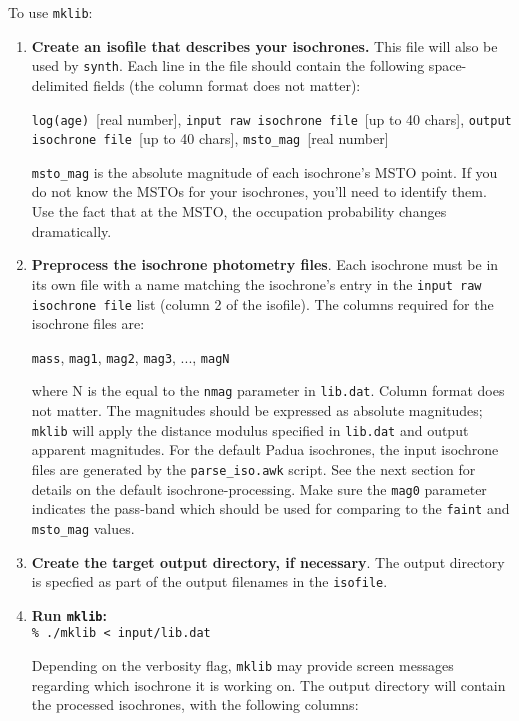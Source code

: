 \documentclass[12pt]{book}
\def\ttg{\tt\color{DarkGreen}}
\def\tto{\tt\color{myOrange}}
\begin{document}
\clearpage

\noindent
To use {\ttg mklib}:

\begin{enumerate}
\item {\bf Create an isofile that describes your isochrones.}  This 
file will also be used by {\ttg synth}.  Each line in the file should 
contain the following space-delimited fields (the column format does 
not matter):

\medskip\noindent
{\tto log(age)}~[real number], 
{\tto input raw isochrone file}~[up to 40 chars], 
{\tto output isochrone file}~[up to 40 chars], 
{\tto msto\_mag}~[real number]

\medskip
{\tto msto\_mag} is the absolute magnitude of each isochrone's MSTO point.  
If you do not know the MSTOs for your isochrones, you'll need to identify 
them.  Use the fact that at the MSTO, the occupation probability changes 
dramatically.
\medskip

\item {\bf Preprocess the isochrone photometry files}.  Each isochrone 
must be in its own file with a name matching the isochrone's entry in 
the {\tto input raw isochrone file} list (column 2 of the isofile).  
The columns required for the isochrone files are:

\medskip\noindent
{\tto mass}, {\tto mag1}, {\tto mag2}, {\tto mag3}, ..., {\tto magN}
 
\medskip
where N is the equal to the {\tto nmag} parameter in {\ttg lib.dat}.  
Column format does not matter.  The magnitudes should be expressed as 
absolute magnitudes; {\ttg mklib} will apply the distance modulus 
specified in {\ttg lib.dat} and output apparent magnitudes.  For the 
default Padua isochrones, the input isochrone files are generated by 
the {\ttg parse\_iso.awk} script. See the next section for details on 
the default isochrone-processing.  Make sure the {\tto mag0} parameter 
indicates the pass-band which should be used for comparing to the 
{\tto faint} and {\tto msto\_mag} values.  

\medskip
\item {\bf Create the target output directory, if necessary}. The 
output directory is specfied as part of the output filenames in the 
{\tto isofile}.

\medskip
\item {\bf Run {\ttg mklib}:} \\
{\ttg \% ./mklib < input/lib.dat}

\medskip
Depending on the verbosity flag, {\ttg mklib} may provide screen 
messages regarding which isochrone it is working on.  The output 
directory will contain the processed isochrones, with the following 
columns:


\end{enumerate}
\end{document}
